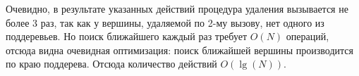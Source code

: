 \begin{frame}
    Очевидно, в результате указанных действий процедура удаления вызывается не более 3 раз,
    так как у вершины, удаляемой по 2-му вызову, нет одного из поддеревьев.
    Но поиск ближайшего каждый раз требует $O(N)$ операций,
    отсюда видна очевидная оптимизация:
    поиск ближайшей вершины производится по краю поддерева.
    Отсюда количество действий $O(\lg(N))$.

\end{frame}
